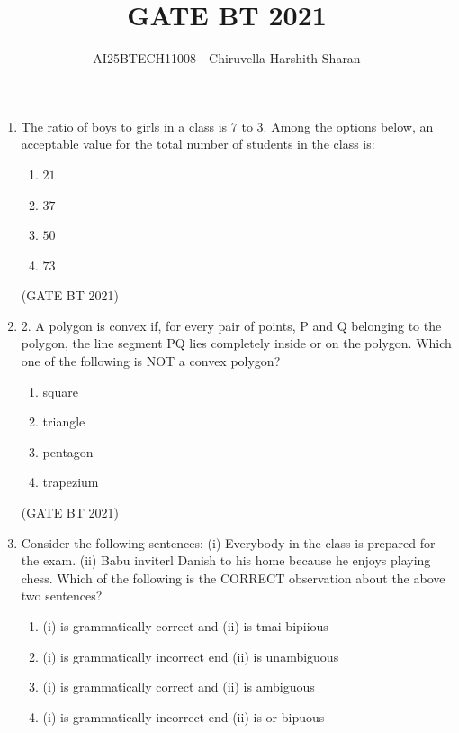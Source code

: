 \documentclass[journal,12pt,onecolumn]{IEEEtran}
\theoremstyle{remark}
\begin{document}
\title{GATE BT 2021}
\author{AI25BTECH11008 - Chiruvella Harshith Sharan}
\maketitle
\renewcommand{\thefigure}{\theenumi}
\renewcommand{\thetable}{\theenumi}

\begin{enumerate}
    \item The ratio of boys to girls in a class is $7$ to $3$.  
Among the options below, an acceptable value for the total number of students in the class is:  

\begin{enumerate}
\item $21$
\item $37$
\item $50$
\item $73$
\end{enumerate}

\hfill (GATE BT 2021)

\item 2.	A polygon is convex if, for every pair of points, P and Q belonging to the polygon, the line segment PQ lies completely inside or on the polygon.
Which one of the following is NOT a convex polygon?

\begin{enumerate}
    \item square
    \item triangle
    \item pentagon
    \item trapezium
\end{enumerate}
\hfill (GATE BT 2021)

\item Consider the following sentences:
(i) Everybody in the class is prepared for the exam.
(ii) Babu inviterl Danish to his home because he enjoys playing chess.
Which of the following is the CORRECT observation about the above two sentences?

\begin{enumerate}
\item (i) is grammatically correct and (ii) is tmai bipiious
\item (i) is grammatically incorrect end (ii) is unambiguous
\item (i) is grammatically correct and (ii) is ambiguous
\item (i) is grammatically incorrect end (ii) is or bipuous
\end{enumerate}


\end{enumerate}
\end{document}
